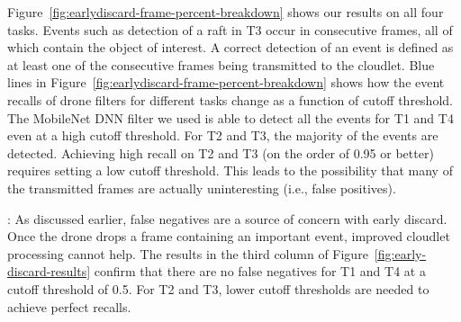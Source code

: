 Figure~\ref{fig:earlydiscard-frame-percent-breakdown} shows our results on all
four tasks. Events such as detection of a raft in T3 occur in consecutive
frames, all of which contain the object of interest. A correct detection of an
event is defined as at least one of the consecutive frames being transmitted to
the cloudlet.  Blue lines in
Figure~\ref{fig:earlydiscard-frame-percent-breakdown} shows how the event
recalls of drone filters for different tasks change as a function of cutoff
threshold. The MobileNet DNN filter we used is able to detect all the events for
T1 and T4 even at a high cutoff threshold. For T2 and T3, the majority of the
events are detected. Achieving high recall on T2 and T3 (on the order of 0.95 or
better) requires setting a low cutoff threshold.  This leads to the possibility
that many of the transmitted frames are actually uninteresting (i.e., false
positives).



: As discussed earlier, false negatives are
a source of concern with early discard.  Once the drone drops a frame
containing an important event, improved cloudlet processing cannot help. The
results in the third column of Figure~\ref{fig:early-discard-results} confirm
that there are no false negatives for T1 and T4 at a cutoff threshold of 0.5.
For T2 and T3, lower cutoff thresholds are needed to achieve perfect recalls.

